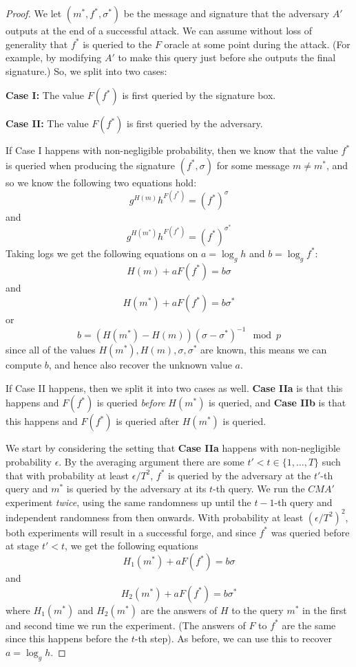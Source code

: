 \begin{proof}
We let \((m^*,f^*,\sigma^*)\) be the message and signature that the
adversary \(A'\) outputs at the end of a successful attack. We can
assume without loss of generality that \(f^*\) is queried to the \(F\)
oracle at some point during the attack. (For example, by modifying
\(A'\) to make this query just before she outputs the final signature.)
So, we split into two cases:

\textbf{Case I:} The value \(F(f^*)\) is first queried by the signature
box.

\textbf{Case II:} The value \(F(f^*)\) is first queried by the
adversary.

If Case I happens with non-negligible probability, then we know that the
value \(f^*\) is queried when producing the signature \((f^*,\sigma)\)
for some message \(m \neq m^*\), and so we know the following two
equations hold: \[ g^{H(m)}h^{F(f^*)} = (f^*)^{\sigma}\] and
\[ g^{H(m^*)}h^{F(f^*)}=  (f^*)^{\sigma^*}\] Taking logs we get the
following equations on \(a = \log_g h\) and \(b=\log_g f^*\):
\[H(m)+aF(f^*) = b\sigma\] and \[H(m^*)+aF(f^*)=b\sigma^*\] or
\[b= (H(m^*)-H(m))(\sigma-\sigma^*)^{-1} \mod p\] since all of the
values \(H(m^*),H(m),\sigma,\sigma^*\) are known, this means we can
compute \(b\), and hence also recover the unknown value \(a\).

If Case II happens, then we split it into two cases as well.
\textbf{Case IIa} is that this happens and \(F(f^*)\) is queried
\emph{before} \(H(m^*)\) is queried, and \textbf{Case IIb} is that this
happens and \(F(f^*)\) is queried after \(H(m^*)\) is queried.

We start by considering the setting that \textbf{Case IIa} happens with
non-negligible probability \(\epsilon\). By the averaging argument there
are some \(t'< t \in \{1,\ldots,T\}\) such that with probability at
least \(\epsilon/T^2\), \(f^*\) is queried by the adversary at the
\(t'\)-th query and \(m^*\) is queried by the adversary at its \(t\)-th
query. We run the \(\ensuremath{\mathit{CMA}}'\) experiment
\emph{twice}, using the same randomness up until the \(t-1\)-th query
and independent randomness from then onwards. With probability at least
\((\epsilon/T^2)^2\), both experiments will result in a successful
forge, and since \(f^*\) was queried before at stage \(t'<t\), we get
the following equations \[H_1(m^*)+aF(f^*) = b\sigma\] and
\[H_2(m^*)+aF(f^*)=b\sigma^*\] where \(H_1(m^*)\) and \(H_2(m^*)\) are
the answers of \(H\) to the query \(m^*\) in the first and second time
we run the experiment. (The answers of \(F\) to \(f^*\) are the same
since this happens before the \(t\)-th step). As before, we can use this
to recover \(a=\log_g h\).


\end{proof}
